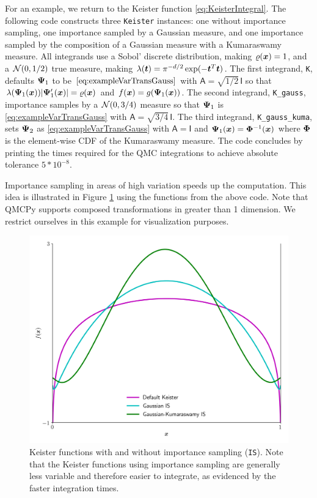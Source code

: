 \documentclass[graybox,footinfo]{svmult}
\newcommand{\mA}{\mathsf{A}}
\newcommand{\mI}{\mathsf{I}}
\begin{document}
For an example, we return to the Keister function \eqref{eq:KeisterIntegral}. The following code constructs three \texttt{Keister} instances: one without importance sampling, one importance sampled by a Gaussian measure, and one importance sampled by the composition of a Gaussian measure with a Kumaraswamy measure. All integrands use a Sobol' discrete distribution, making $\varrho({\boldsymbol{x}})=1$, and a ${\mathcal{N}}(0,1/2)$ true measure, making $\lambda({\boldsymbol{t}}) = \pi^{-d/2} \exp(-{\boldsymbol{t}}^T {\boldsymbol{t}})$. The first integrand, \texttt{K}, defaults ${\boldsymbol{\Psi}}_1$ to be $\eqref{eq:exampleVarTransGauss}$ with $\mA = \sqrt{1/2} \, \mI$ so that  $\lambda({\boldsymbol{\Psi}}_1({\boldsymbol{x}})) \lvert {\boldsymbol{\Psi}}_1'({\boldsymbol{x}}) \rvert = \varrho({\boldsymbol{x}})$ and $f({\boldsymbol{x}}) = g({\boldsymbol{\Psi}}_1({\boldsymbol{x}}))$. The second integrand, \texttt{K\_gauss}, importance samples by a ${\mathcal{N}}(0,3/4)$ measure so that ${\boldsymbol{\Psi}}_1$ is \eqref{eq:exampleVarTransGauss} with $\mA = \sqrt{3/4} \, \mI$. The third integrand, \texttt{K\_gauss\_kuma}, sets ${\boldsymbol{\Psi}}_2$ as \eqref{eq:exampleVarTransGauss} with $\mA = \mI$ and ${\boldsymbol{\Psi}}_1({\boldsymbol{x}}) = {\boldsymbol{\Phi}}^{-1}({\boldsymbol{x}})$ where ${\boldsymbol{\Phi}}$ is the element-wise CDF of the Kumaraswamy measure. The code concludes by printing the times required for the QMC integrations to achieve absolute tolerance $5*10^{-8}$.


Importance sampling in areas of high variation speeds up the computation. This idea is illustrated in Figure \ref{fig:mIS} using the functions from the above code. Note that QMCPy supports composed transformations in greater than 1 dimension. We restrict ourselves in this example for visualization purposes. 
\begin{figure}
    \centering
	\includegraphics[width=.8\textwidth]{QMCSoftwareArticle/figs/multiple_IS.png}
	\caption{Keister functions with and without importance sampling (\texttt{IS}). Note that the Keister functions using importance sampling are generally less variable and therefore easier to integrate, as evidenced by the faster integration times.} \label{fig:mIS}
\end{figure}
\end{document}
